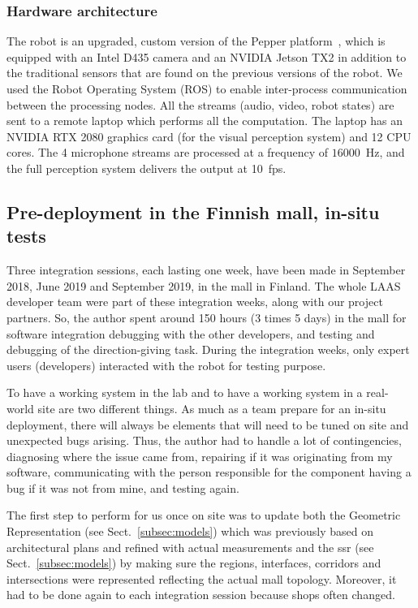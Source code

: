 \documentclass[a4paper,11pt,twoside]{StyleThese}
\begin{document}
\subsubsection{Hardware architecture}\label{subsec:hw}
The robot is an upgraded, custom version of the Pepper platform~\citep{caniot_adapted_2020}, which is equipped with an Intel D435 camera and an NVIDIA Jetson TX2 in addition to the traditional sensors that are found on the previous versions of the robot. We used the Robot Operating System (ROS) to enable inter-process communication between the processing nodes. All the streams (audio, video, robot states) are sent to a remote laptop which performs all the computation. The laptop has an NVIDIA RTX 2080 graphics card (for the visual perception system) and 12 CPU cores. The 4 microphone streams are processed at a frequency of $16000$~Hz, and the full perception system delivers the output at 10~fps.

\subsection{Pre-deployment in the Finnish mall, in-situ tests}\label{subsec:tests_mall}

Three integration sessions, each lasting one week, have been made in September 2018, June 2019 and September 2019, in the mall in Finland. The whole LAAS developer team were part of these integration weeks, along with our project partners. So, the author spent around 150 hours (3 times 5 days) in the mall for software integration debugging with the other developers, and testing and debugging of the direction-giving task. 
During the integration weeks, only expert users (developers) interacted with the robot for testing purpose. 

To have a working system in the lab and to have a working system in a real-world site are two different things. As much as a team prepare for an in-situ deployment, there will always be elements that will need to be tuned on site and unexpected bugs arising. Thus, the author had to handle a lot of contingencies, diagnosing where the issue came from, repairing if it was originating from my software, communicating with the person responsible for the component having a bug if it was not from mine, and testing again.

The first step to perform for us once on site was to update both the Geometric Representation (see Sect.~\ref{subsec:models}) which was previously based on architectural plans and refined with actual measurements and the \acrlong{ssr} (see Sect.~\ref{subsec:models}) by making sure the regions, interfaces, corridors and intersections were represented reflecting the actual mall topology. Moreover, it had to be done again to each integration session because shops often changed.
\end{document}
